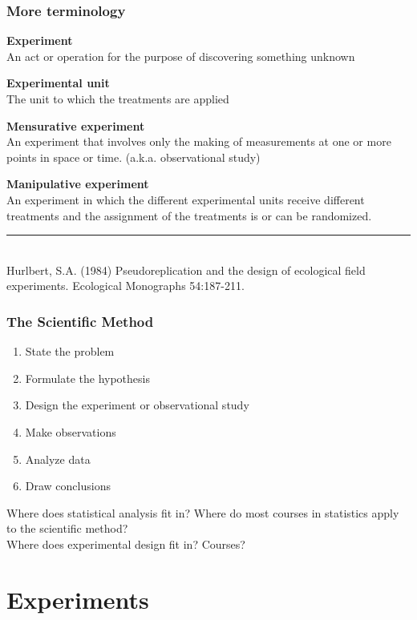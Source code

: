 \documentclass[color=usenames,dvipsnames]{beamer}\usepackage[]{graphicx}\usepackage[]{color}
\begin{document}
\begin{frame}
  \frametitle{More terminology} 
  {\bf Experiment} \\
  An act or operation for the purpose of discovering something unknown \par
  \vspace{6pt}
  {\bf Experimental unit} \\
  The unit to which the treatments are applied \par
  \vspace{6pt}
  {\bf Mensurative experiment} \\
  An experiment that involves only the making of measurements at one
  or more points in space or time. (a.k.a. observational study) \par
  \vspace{6pt}
  {\bf Manipulative experiment} \\
  An experiment in which the different experimental units receive
  different treatments and the assignment of the treatments is or can
  be randomized. \\
  \vfill
  \vspace{6pt}
  \rule[0mm]{1cm}{0.1mm} \\
  \footnotesize
  Hurlbert, S.A. (1984) Pseudoreplication and the design of ecological field
  experiments.  Ecological Monographs 54:187-211.
\end{frame}



\begin{frame}
  \frametitle{The Scientific Method}
  \begin{enumerate}[1.]
    \item State the problem
    \item Formulate the hypothesis
    \item Design the experiment or observational study
    \item Make observations
    \item Analyze data
    \item Draw conclusions
    \end{enumerate}
\vfill    
\centering    
Where does statistical analysis fit in?  Where do most courses in
statistics apply to the scientific method? \\
\vfill
Where does experimental design fit in?  Courses? \\
\end{frame}

\section{Experiments}
\end{document}
